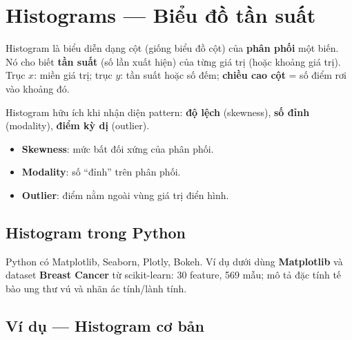 \section{Histograms --- Biểu đồ tần suất}
\label{sec:histograms}

\begin{dinhnghia}[title={Histogram}]
Histogram là biểu diễn dạng cột (giống biểu đồ cột) của \textbf{phân phối} một biến.
Nó cho biết \textbf{tần suất} (số lần xuất hiện) của từng giá trị (hoặc khoảng giá trị).
Trục $x$: miền giá trị; trục $y$: tần suất hoặc số đếm; \textbf{chiều cao cột} = số điểm rơi vào khoảng đó.
\end{dinhnghia}

\begin{ynghia}[title={Histogram dùng để làm gì?}]
Histogram hữu ích khi nhận diện pattern: \textbf{độ lệch} (skewness), \textbf{số đỉnh} (modality), \textbf{điểm kỳ dị} (outlier).
\begin{itemize}
  \item \textbf{Skewness}: mức bất đối xứng của phân phối.
  \item \textbf{Modality}: số ``đỉnh'' trên phân phối.
  \item \textbf{Outlier}: điểm nằm ngoài vùng giá trị điển hình.
\end{itemize}
\end{ynghia}

\subsection{Histogram trong Python}

\begin{phuongphap}[title={Thư viện và dataset ví dụ}]
Python có Matplotlib, Seaborn, Plotly, Bokeh.
Ví dụ dưới dùng \textbf{Matplotlib} và dataset \textbf{Breast Cancer} từ scikit-learn: 30 feature, 569 mẫu; mô tả đặc tính tế bào ung thư vú và nhãn ác tính/lành tính.
\end{phuongphap}

\subsection{Ví dụ --- Histogram cơ bản}

